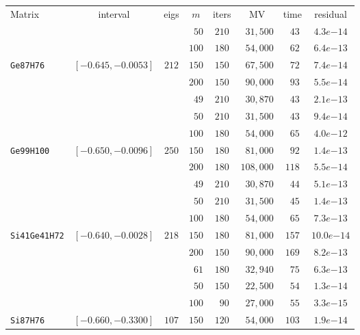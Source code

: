 \begin{tabular}{l|c|c|c|c|c|c|c}
\hline
\multirow{2}{*}{Matrix} & \multirow{2}{*}{interval} & \multirow{2}{*}{eigs} & \multirow{2}{*}{$m$} & \multirow{2}{*}{iters} & \multirow{2}{*}{MV} & \multirow{2}{*}{time} & \multirow{2}{*}{residual} \\
 & & & & & & & \\\hline
\hline
 & & & $\phantom{0}50$ & $210$ & $\phantom{0}31,500$ & $\phantom{0}43$ & $4.3e{-14}$ \\
 & & & $100$ & $180$ & $\phantom{0}54,000$ & $\phantom{0}62$ & $6.4e{-13}$ \\
\verb|Ge87H76| & $[-0.645,-0.0053]$ & $212$ & $150$ & $150$ & $\phantom{0}67,500$ & $\phantom{0}72$ & $7.4e{-14}$ \\\hline
 & & & $200$ & $150$ & $\phantom{0}90,000$ & $\phantom{0}93$ & $5.5e{-14}$ \\
 & & & $\phantom{0}49$ & $210$ & $\phantom{0}30,870$ & $\phantom{0}43$ & $2.1e{-13}$ \\
 & & & $\phantom{0}50$ & $210$ & $\phantom{0}31,500$ & $\phantom{0}43$ & $9.4e{-14}$ \\
 & & & $100$ & $180$ & $\phantom{0}54,000$ & $\phantom{0}65$ & $4.0e{-12}$ \\
\verb|Ge99H100| & $[-0.650,-0.0096]$ & $250$ & $150$ & $180$ & $\phantom{0}81,000$ & $\phantom{0}92$ & $1.4e{-13}$ \\\hline
 & & & $200$ & $180$ & $108,000$ & $118$ & $5.5e{-14}$ \\
 & & & $\phantom{0}49$ & $210$ & $\phantom{0}30,870$ & $\phantom{0}44$ & $5.1e{-13}$ \\
 & & & $\phantom{0}50$ & $210$ & $\phantom{0}31,500$ & $\phantom{0}45$ & $1.4e{-13}$ \\
 & & & $100$ & $180$ & $\phantom{0}54,000$ & $\phantom{0}65$ & $7.3e{-13}$ \\
\verb|Si41Ge41H72| & $[-0.640,-0.0028]$ & $218$ & $150$ & $180$ & $\phantom{0}81,000$ & $157$ & $10.0e{-14}$ \\\hline
 & & & $200$ & $150$ & $\phantom{0}90,000$ & $169$ & $8.2e{-13}$ \\
 & & & $\phantom{0}61$ & $180$ & $\phantom{0}32,940$ & $\phantom{0}75$ & $6.3e{-13}$ \\
 & & & $\phantom{0}50$ & $150$ & $\phantom{0}22,500$ & $\phantom{0}54$ & $1.3e{-14}$ \\
 & & & $100$ & $\phantom{0}90$ & $\phantom{0}27,000$ & $\phantom{0}55$ & $3.3e{-15}$ \\
\verb|Si87H76| & $[-0.660,-0.3300]$ & $107$ & $150$ & $120$ & $\phantom{0}54,000$ & $103$ & $1.9e{-14}$ \\\hline

\end{tabular}
